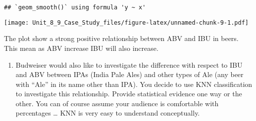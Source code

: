 \documentclass[
]{article}
\providecommand{\tightlist}{%
  \setlength{\itemsep}{0pt}\setlength{\parskip}{0pt}}
\begin{document}
\begin{verbatim}
## `geom_smooth()` using formula 'y ~ x'
\end{verbatim}

\texttt{[image: Unit\_8\_9\_Case\_Study\_files/figure-latex/unnamed-chunk-9-1.pdf]}

The plot show a strong positive relationship between ABV and IBU in
beers. This mean as ABV increase IBU will also increase.

\begin{enumerate}
\def\labelenumi{\arabic{enumi}.}
\setcounter{enumi}{7}
\tightlist
\item
  Budweiser would also like to investigate the difference with respect
  to IBU and ABV between IPAs (India Pale Ales) and other types of Ale
  (any beer with ``Ale'' in its name other than IPA). You decide to use
  KNN classification to investigate this relationship. Provide
  statistical evidence one way or the other. You can of course assume
  your audience is comfortable with percentages \ldots{} KNN is very
  easy to understand conceptually.
\end{enumerate}
\end{document}
